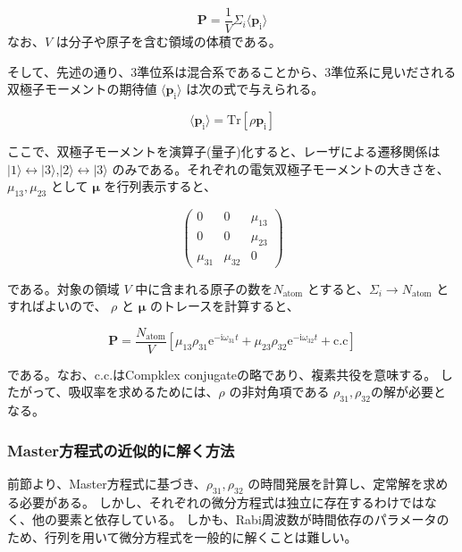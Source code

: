 \documentclass[11pt,a4paper]{ltjsarticle}
\begin{document}
\begin{equation*}
  \mathbf{P} = \frac{1}{V} \Sigma_{i}  \langle \mathbf{p}_{\mathrm{i}} \rangle
\end{equation*}
なお、$V$ は分子や原子を含む領域の体積である。

そして、先述の通り、3準位系は混合系であることから、3準位系に見いだされる双極子モーメントの期待値 $ \langle \mathbf{p}_{\mathrm{i}} \rangle $
は次の式で与えられる。

\begin{equation*}
 \langle \mathbf{p}_{\mathrm{i}} \rangle = \mathrm{Tr} [\rho \mathbf{p}_{\mathrm{i}} ]
\end{equation*}

ここで、双極子モーメントを演算子(量子)化すると、レーザによる遷移関係は$|1 \rangle \leftrightarrow | 3\rangle$,$|2 \rangle \leftrightarrow | 3 \rangle$ 
のみである。それぞれの電気双極子モーメントの大きさを、$\mu_{13}, \mu_{23} $ として $\mathbf{\mu}$ を行列表示すると、

\[
\begin{pmatrix}
   0        &      0    &    \mu_{13} \\
   0        &      0     &    \mu_{23} \\
   \mu_{31} & \mu_{32}  &        0   
\end{pmatrix}
\]

である。対象の領域 $V$ 中に含まれる原子の数を$N_{\mathrm{atom}}$ とすると、$\Sigma_{i} \rightarrow N_{\mathrm{atom}}$ とすればよいので、
 $\rho$ と $\mathbf{\mu}$ のトレースを計算すると、

\begin{equation*}
  \mathbf{P} = \frac{N_{\mathrm{atom}}}{V} \left[ \mu_{13} \rho_{31} \mathrm{e}^{- \mathrm{i} \omega_{31} t } +  \mu_{23} \rho_{32} \mathrm{e}^{- \mathrm{i} \omega_{32} t } + \mathrm{c.c} \right]
\end{equation*}

である。なお、c.c.はCompklex conjugateの略であり、複素共役を意味する。
したがって、吸収率を求めるためには、$\rho$ の非対角項である $\rho_{31},\rho_{32}$の解が必要となる。

\subsubsection{Master方程式の近似的に解く方法}

前節より、Master方程式に基づき、$\rho_{31},\rho_{32}$ の時間発展を計算し、定常解を求める必要がある。
しかし、それぞれの微分方程式は独立に存在するわけではなく、他の要素と依存している。
しかも、Rabi周波数が時間依存のパラメータのため、行列を用いて微分方程式を一般的に解くことは難しい。
\end{document}
